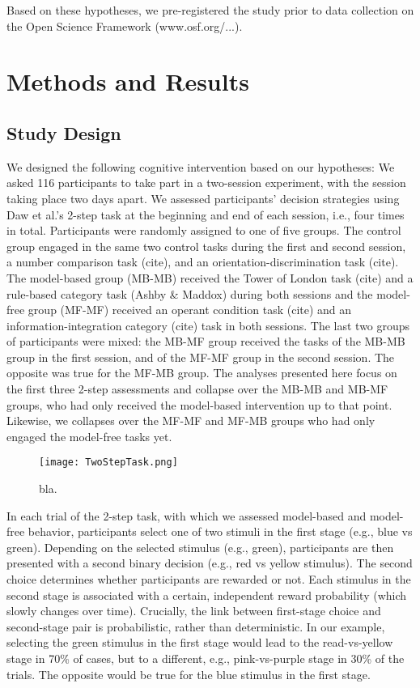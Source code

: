 \documentclass[11pt]{article} %
\begin{document}
Based on these hypotheses, we pre-registered the study prior to data collection on the Open Science Framework (www.osf.org/...).

\section{Methods and Results}
\subsection{Study Design}

We designed the following cognitive intervention based on our hypotheses: We asked 116 participants to take part in a two-session experiment, with the session taking place two days apart. We assessed participants' decision strategies using Daw et al.'s 2-step task at the beginning and end of each session, i.e., four times in total. Participants were randomly assigned to one of five groups. The control group engaged in the same two control tasks during the first and second session, a number comparison task (cite), and an orientation-discrimination task (cite). The model-based group (MB-MB) received the Tower of London task (cite) and a rule-based category task (Ashby \& Maddox) during both sessions and the model-free group (MF-MF) received an operant condition task (cite) and an information-integration category (cite) task in both sessions. The last two groups of participants were mixed: the MB-MF group received the tasks of the MB-MB group in the first session, and of the MF-MF group in the second session. The opposite was true for the MF-MB group. The analyses presented here focus on the first three 2-step assessments and collapse over the MB-MB and MB-MF groups, who had only received the model-based intervention up to that point. Likewise, we collapses over the MF-MF and MF-MB groups who had only engaged the model-free tasks yet.

\begin{figure}
	\texttt{[image: TwoStepTask.png]}
	\caption{bla.}
	\label{TwoStep}
\end{figure}

In each trial of the 2-step task, with which we assessed model-based and model-free behavior, participants select one of two stimuli in the first stage (e.g., blue vs green). Depending on the selected stimulus (e.g., green), participants are then presented with a second binary decision (e.g., red vs yellow stimulus). The second choice determines whether participants are rewarded or not. Each stimulus in the second stage is associated with a certain, independent reward probability (which slowly changes over time). Crucially, the link between first-stage choice and second-stage pair is probabilistic, rather than deterministic. In our example, selecting the green stimulus in the first stage would lead to the read-vs-yellow stage in 70\% of cases, but to a different, e.g., pink-vs-purple stage in 30\% of the trials. The opposite would be true for the blue stimulus in the first stage.
\end{document}
